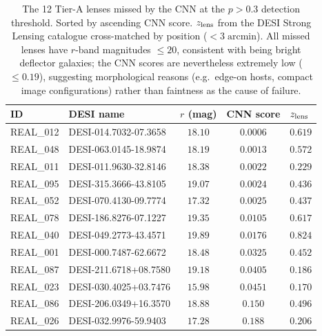 \begin{table}
\centering
\caption{The 12 Tier-A lenses missed by the CNN at the $p > 0.3$ detection threshold.  Sorted by ascending CNN score.  $z_{\rm lens}$ from the DESI Strong Lensing catalogue cross-matched by position ($< 3\;\mathrm{arcmin}$).  All missed lenses have $r$-band magnitudes $\leq 20$, consistent with being bright deflector galaxies; the CNN scores are nevertheless extremely low ($\leq 0.19$), suggesting morphological reasons (e.g.\ edge-on hosts, compact image configurations) rather than faintness as the cause of failure.}
\label{tab:missed}
\small
\begin{tabular}{llccl}
\hline
ID & DESI name & $r$ (mag) & CNN score & $z_{\rm lens}$ \\
\hline
REAL_012 & DESI-014.7032-07.3658 & $18.10$ & $0.0006$ & $0.619$ \\
REAL_048 & DESI-063.0145-18.9874 & $18.19$ & $0.0013$ & $0.572$ \\
REAL_011 & DESI-011.9630-32.8146 & $18.38$ & $0.0022$ & $0.229$ \\
REAL_095 & DESI-315.3666-43.8105 & $19.07$ & $0.0024$ & $0.436$ \\
REAL_052 & DESI-070.4130-09.7774 & $17.32$ & $0.0025$ & $0.437$ \\
REAL_078 & DESI-186.8276-07.1227 & $19.35$ & $0.0105$ & $0.617$ \\
REAL_040 & DESI-049.2773-43.4571 & $19.89$ & $0.0176$ & $0.824$ \\
REAL_001 & DESI-000.7487-62.6672 & $18.48$ & $0.0325$ & $0.452$ \\
REAL_087 & DESI-211.6718+08.7580 & $19.18$ & $0.0405$ & $0.186$ \\
REAL_023 & DESI-030.4025+03.7476 & $15.98$ & $0.0451$ & $0.170$ \\
REAL_086 & DESI-206.0349+16.3570 & $18.88$ & $0.150$ & $0.496$ \\
REAL_026 & DESI-032.9976-59.9403 & $17.28$ & $0.188$ & $0.206$ \\
\hline
\end{tabular}
\end{table}
